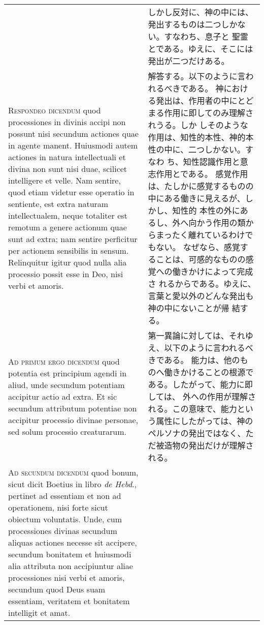 \documentclass[10pt]{jsarticle} %
\begin{document}
\begin{longtable}{p{21em}p{21em}}
&

しかし反対に、神の中には、発出するものは二つしかない。すなわち、息子と
 聖霊とである。ゆえに、そこには発出が二つだけある。

\\



{\scshape Respondeo dicendum} quod processiones in divinis accipi non possunt nisi
 secundum actiones quae in agente manent. Huiusmodi autem actiones in
 natura intellectuali et divina non sunt nisi duae, scilicet intelligere
 et velle. Nam sentire, quod etiam videtur esse operatio in sentiente,
 est extra naturam intellectualem, neque totaliter est remotum a genere
 actionum quae sunt ad extra; nam sentire perficitur per actionem
 sensibilis in sensum. Relinquitur igitur quod nulla alia processio
 possit esse in Deo, nisi verbi et amoris.

&

解答する。以下のように言われるべきである。
神における発出は、作用者の中にとどまる作用に即してのみ理解されうる。しか
 しそのような作用は、知性的本性、神的本性の中に、二つしかない。すなわ
 ち、知性認識作用と意志作用とである。
感覚作用は、たしかに感覚するものの中にある働きに見えるが、しかし、知性的
 本性の外にあるし、外へ向かう作用の類からまったく離れているわけでもない。
 なぜなら、感覚することは、可感的なものの感覚への働きかけによって完成さ
 れるからである。ゆえに、言葉と愛以外のどんな発出も神の中にないことが帰
 結する。

\\



{\scshape Ad primum ergo dicendum} quod potentia est principium agendi in aliud,
 unde secundum potentiam accipitur actio ad extra. Et sic secundum
 attributum potentiae non accipitur processio divinae personae, sed
 solum processio creaturarum.

&

第一異論に対しては、それゆえ、以下のように言われるべきである。
能力は、他のものへ働きかけることの根源である。したがって、能力に即しては、
 外への作用が理解される。この意味で、能力という属性にしたがっては、神の
 ペルソナの発出ではなく、ただ被造物の発出だけが理解される。

\\



{\scshape Ad secundum dicendum} quod bonum, sicut dicit Boetius in libro {\itshape de Hebd}.,
 pertinet ad essentiam et non ad operationem, nisi forte sicut obiectum
 voluntatis. Unde, cum processiones divinas secundum aliquas actiones
 necesse sit accipere, secundum bonitatem et huiusmodi alia attributa
 non accipiuntur aliae processiones nisi verbi et amoris, secundum quod
 Deus suam essentiam, veritatem et bonitatem intelligit et amat.


\end{longtable}
\end{document}
